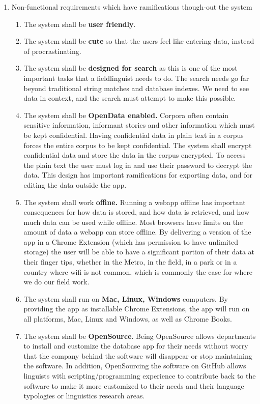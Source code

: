 \documentclass[12pt]{article}
\begin{document}
\begin{exe}

\ex  
\begin{enumerate}
\item [] Non-functional requirements which have ramifications though-out the system

\begin{enumerate}
\item The system shall be \textbf{user friendly}.
\item The system shall be \textbf{cute} so that the users feel like entering data, instead of procrastinating.
\item The system shall be \textbf{designed for search} as this is one of the most important tasks that a fieldlinguist needs to do. The search needs go far beyond traditional string matches and database indexes. We need to see data in context, and the search must attempt to make this possible. 
\item The system shall be \textbf{OpenData enabled.} Corpora often contain sensitive information, informant stories and other information which must be kept confidential. Having confidential data in plain text in a corpus forces the entire corpus to be kept confidential. The system shall encrypt confidential data and store the data in the corpus encrypted. To access the plain text the user must log in and use their password to decrypt the data. This design has important ramifications for exporting data, and for editing the data outside the app. 
\item The system shall work \textbf{offine.} Running a webapp offline has important consequences for how data is stored, and how data is retrieved, and how much data can be used while offline. Most browsers have limits on the amount of data a webapp can store offline. By delivering a version of the app in a Chrome Extension (which has permission to have unlimited storage) the user will be able to have a significant portion of their data at their finger tips, whether in the Metro, in the field, in a park or in a country where wifi is not common, which is commonly the case for where we do our field work.
\item The system shall run on \textbf{Mac, Linux, Windows} computers. By providing the app as installable Chrome Extensions, the app will run on all platforms, Mac, Linux and Windows, as well as Chrome Books. 
\item The system shall be \textbf{OpenSource}. Being OpenSource allows departments to install and customize the database app for their needs without worry that the company behind the software will disappear or stop maintaining the software. In addition, OpenSourcing the software on GitHub allows linguists with scripting/programming experience to contribute back to the software to make it more customized to their needs and their language typologies or linguistics research areas.

\end{enumerate}
\end{enumerate}
\end{exe}
\end{document}
